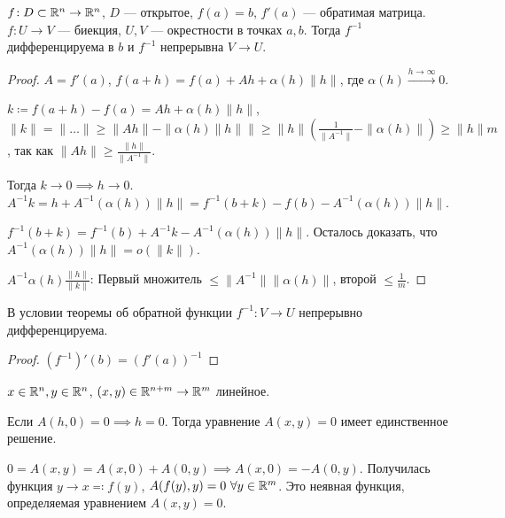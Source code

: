 \begin{theorem}
    $f\!: D \subset \mathbb{R}^n \to \mathbb{R}^n$, $D$ --- открытое,  $f(a) = b$,  $f'(a)$ --- обратимая матрица.  $f\!: U \to V$ ---  биекция,  $U, V$ --- окрестности в точках  $a, b$. Тогда  $f^{-1}$ дифференцируема в  $b$ и  $f^{-1}$ непрерывна  $V \to U$.
\end{theorem}
\begin{proof}
    $A = f'(a)$,  $f(a+h) = f(a) + Ah + \alpha(h) \|h\|$, где  $\alpha(h) \xrightarrow{h \to \infty} 0$.

    $k \coloneqq f(a+h) - f(a) = Ah + \alpha(h)\|h\|$, $\|k\| = \|\ldots\| \ge \|Ah\| - \|\alpha(h)\|h\|\| \ge \|h\|(\frac{1}{\|A^{-1}\|} - \|\alpha(h)\|) \ge \|h\|m$, так как $\|Ah\| \ge \frac{\|h\|}{\|A^{-1}\|}$.

    Тогда $k \to 0 \implies h \to 0$.  $A^{-1}k = h + A^{-1}(\alpha(h))\|h\| = f^{-1}(b+k) - f(b) - A^{-1}(\alpha(h))\|h\|$.

    $f^{-1}(b+k) = f^{-1}(b) + A^{-1}k - A^{-1}(\alpha(h)) \|h\|$. Осталось доказать, что  $A^{-1}(\alpha(h))\|h\| = o(\|k\|)$. 

    $A^{-1}\alpha(h) \frac{\|h\|}{\|k\|}$: Первый множитель $\le \|A^{-1}\|\|\alpha(h)\|$, второй $\le \frac{1}{m}$.
\end{proof}
\begin{consequence}
    В условии теоремы об обратной функции $f^{-1}\!: V \to U$ непрерывно дифференцируема.
\end{consequence}
\begin{proof}
    $(f^{-1})'(b) = (f'(a))^{-1}$
\end{proof}
$x \in \mathbb{R}^n, y \in \mathbb{R}^n$,  $(x, y) \in \mathbb{R}^{n+m} \to \mathbb{R}^m$ линейное.

Если  $A(h, 0) = 0 \implies h = 0$. Тогда уравнение  $A(x, y) = 0$ имеет единственное решение.

$0 = A(x, y) = A(x, 0) + A(0, y) \implies A(x, 0) = -A(0, y)$. Получилась функция  $y \to x \eqqcolon f(y)$,  $A(f(y), y) = 0\ \forall y \in \mathbb{R}^m$. Это неявная функция, определяемая уравнением  $A(x, y) = 0$.

